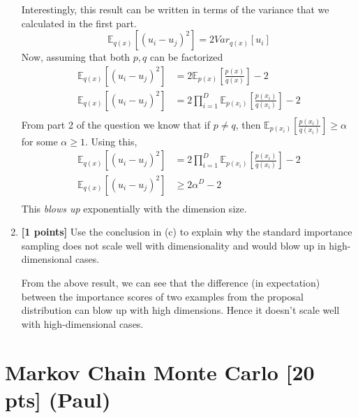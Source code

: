 \documentclass[10pt]{article}
\begin{document}
\begin{enumerate}
\begin{solution}
Interestingly, this result can be written in terms of the variance that we calculated in the first part. \\
\begin{equation} \label{eq:var_result}
    \mathbb{E}_{q(x)} [(u_i-u_j)^2] = 2 {Var}_{q(x)}[u_i]
\end{equation}
Now, assuming that both $p, q$ can be factorized
\begin{align*}
    \mathbb{E}_{q(x)} [(u_i-u_j)^2] &= 2\mathbb{E}_{p(x)}\left[\frac{p(x)}{q(x)}\right] - 2\\
    \mathbb{E}_{q(x)} [(u_i-u_j)^2] &= 2 \prod_{i=1}^D \mathbb{E}_{p(x_i)}\left[\frac{p(x_i)}{q(x_i)}\right] - 2\\
\end{align*}
From part 2 of the question we know that if $p \neq q$, then  $\mathbb{E}_{p(x_i)} \left[\frac{p(x_i)}{q(x_i)} \right] \ge \alpha$ for some $\alpha \ge 1$. Using this,
\begin{align*}
    \mathbb{E}_{q(x)} [(u_i-u_j)^2] &= 2 \prod_{i=1}^D \mathbb{E}_{p(x_i)}\left[\frac{p(x_i)}{q(x_i)}\right] - 2\\
    \mathbb{E}_{q(x)} [(u_i-u_j)^2] &\ge 2 \alpha^D - 2 \\
\end{align*}
This \emph{blows up} exponentially with the dimension size.
\end{solution}

    \item \textbf{[1 points]} Use the conclusion in (c) to explain why the standard importance sampling does not scale well with dimensionality and would blow up in high-dimensional cases.

\begin{solution}
From the above result, we can see that the difference (in expectation) between the importance scores of two examples from the proposal distribution can blow up with high dimensions. Hence it doesn't scale well with high-dimensional cases.
\end{solution}

\end{enumerate}

\newpage

\section{Markov Chain Monte Carlo [20 pts] (Paul)}
\end{document}

